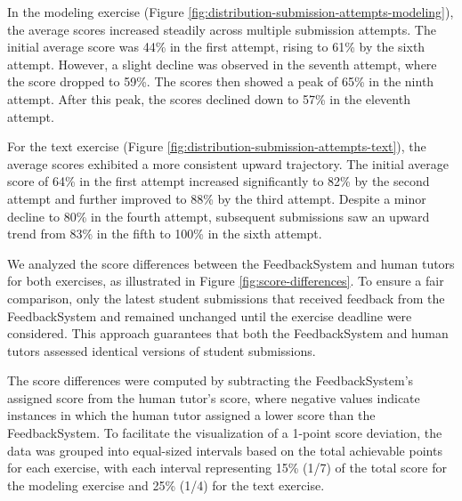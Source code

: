 \documentclass[sigconf,screen,review,anonymous]{acmart}
\begin{document}
In the modeling exercise (Figure \ref{fig:distribution-submission-attempts-modeling}), the average scores increased steadily across multiple submission attempts.
The initial average score was 44\% in the first attempt, rising to 61\% by the sixth attempt.
However, a slight decline was observed in the seventh attempt, where the score dropped to 59\%.
The scores then showed a peak of 65\% in the ninth attempt.
After this peak, the scores declined down to 57\% in the eleventh attempt.

For the text exercise (Figure \ref{fig:distribution-submission-attempts-text}), the average scores exhibited a more consistent upward trajectory.
The initial average score of 64\% in the first attempt increased significantly to 82\% by the second attempt and further improved to 88\% by the third attempt.
Despite a minor decline to 80\% in the fourth attempt, subsequent submissions saw an upward trend from 83\% in the fifth to 100\% in the sixth attempt.


We analyzed the score differences between the FeedbackSystem and human tutors for both exercises, as illustrated in Figure \ref{fig:score-differences}.
To ensure a fair comparison, only the latest student submissions that received feedback from the FeedbackSystem and remained unchanged until the exercise deadline were considered.
This approach guarantees that both the FeedbackSystem and human tutors assessed identical versions of student submissions.

The score differences were computed by subtracting the FeedbackSystem's assigned score from the human tutor's score, where negative values indicate instances in which the human tutor assigned a lower score than the FeedbackSystem.
To facilitate the visualization of a 1-point score deviation, the data was grouped into equal-sized intervals based on the total achievable points for each exercise, with each interval representing 15\% (1/7) of the total score for the modeling exercise and 25\% (1/4) for the text exercise.
\end{document}

